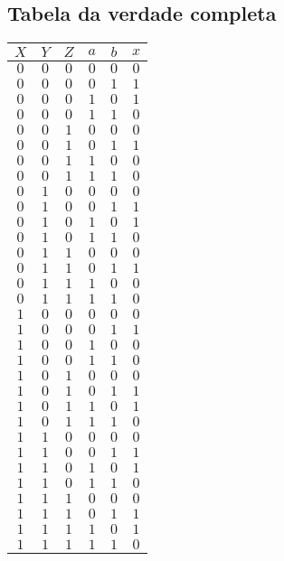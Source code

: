 \documentclass [15pt,a4paper,twoside]{article}
\begin{document}
\subsection{Tabela da verdade completa}
\begin{center}
\begin{tabular}{ccccc|c}
$X$&$Y$&$Z$&$a$&$b$&$x$\\
\hline
$0$&$0$&$0$&$0$&$0$&$0$\\
$0$&$0$&$0$&$0$&$1$&$1$\\
$0$&$0$&$0$&$1$&$0$&$1$\\
$0$&$0$&$0$&$1$&$1$&$0$\\
$0$&$0$&$1$&$0$&$0$&$0$\\
$0$&$0$&$1$&$0$&$1$&$1$\\
$0$&$0$&$1$&$1$&$0$&$0$\\
$0$&$0$&$1$&$1$&$1$&$0$\\
$0$&$1$&$0$&$0$&$0$&$0$\\
$0$&$1$&$0$&$0$&$1$&$1$\\
$0$&$1$&$0$&$1$&$0$&$1$\\
$0$&$1$&$0$&$1$&$1$&$0$\\
$0$&$1$&$1$&$0$&$0$&$0$\\
$0$&$1$&$1$&$0$&$1$&$1$\\
$0$&$1$&$1$&$1$&$0$&$0$\\
$0$&$1$&$1$&$1$&$1$&$0$\\
$1$&$0$&$0$&$0$&$0$&$0$\\
$1$&$0$&$0$&$0$&$1$&$1$\\
$1$&$0$&$0$&$1$&$0$&$0$\\
$1$&$0$&$0$&$1$&$1$&$0$\\
$1$&$0$&$1$&$0$&$0$&$0$\\
$1$&$0$&$1$&$0$&$1$&$1$\\
$1$&$0$&$1$&$1$&$0$&$1$\\
$1$&$0$&$1$&$1$&$1$&$0$\\
$1$&$1$&$0$&$0$&$0$&$0$\\
$1$&$1$&$0$&$0$&$1$&$1$\\
$1$&$1$&$0$&$1$&$0$&$1$\\
$1$&$1$&$0$&$1$&$1$&$0$\\
$1$&$1$&$1$&$0$&$0$&$0$\\
$1$&$1$&$1$&$0$&$1$&$1$\\
$1$&$1$&$1$&$1$&$0$&$1$\\
$1$&$1$&$1$&$1$&$1$&$0$\\

\end{tabular}
\end{center}
\end{document}

